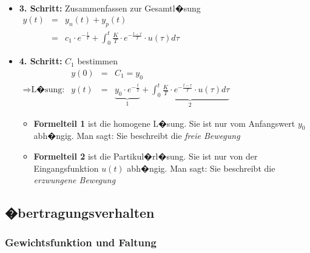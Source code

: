 \documentclass[12pt,a4paper,ngerman]{scrartcl}
\begin{document}
\begin{itemize}
\begin{math}
\begin{array}{lllllllll}
    \end{array}
  \end{math}
\item \textbf{3. Schritt:} Zusammenfassen zur Gesamtl�sung\\
  \begin{math}
    \begin{array}{lll}
      y(t)&=&y_n(t)+y_p(t)\\
          &=&c_1\cdot e^{-\frac{t}{T}}+\int_0^t{\frac{K}{T}\cdot e^{-\frac{t-\tau}{T}}\cdot u(\tau)d\tau}
    \end{array}
  \end{math}
\item \textbf{4. Schritt:} $C_1$ bestimmen\\
  \begin{math}
    \begin{array}{llll}
     &y(0)&=&C_1=y_0\\
     \Rightarrow \text{L�sung:}&y(t)&=&\underbrace{y_0\cdot e^{-\frac{t}{T}}}_{1}+\underbrace{\int_0^t{\frac{K}{T}\cdot e^{-\frac{t-\tau}{T}}\cdot u(\tau)d\tau}}_{2}
    \end{array}
  \end{math}
  \begin{itemize}
  \item \textbf{Formelteil 1} ist die homogene L�sung. Sie ist nur vom Anfangswert $y_0$ abh�ngig. Man sagt: Sie beschreibt die \emph{freie Bewegung}
  \item \textbf{Formelteil 2} ist die Partikul�rl�sung. Sie ist nur von der Eingangsfunktion $u(t)$ abh�ngig. Man sagt: Sie beschreibt die \emph{erzwungene Bewegung}
  \end{itemize}
\end{itemize}

\subsection{�bertragungsverhalten}

\subsubsection{Gewichtsfunktion und Faltung}
\end{document}
